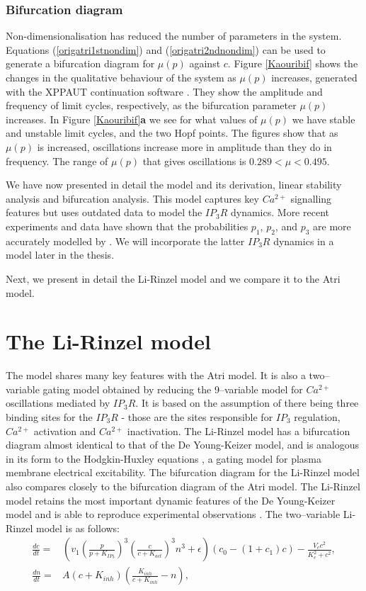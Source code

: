 \subsubsection{Bifurcation diagram}
Non-dimensionalisation has reduced the number of parameters in the system. Equations (\ref{origatri1stnondim}) and (\ref{origatri2ndnondim}) can be used to generate a bifurcation diagram for $\mu(p)$ against $c$. Figure \ref{Kaouribif} \cite{kaouri} shows the changes in the qualitative behaviour of the system as $\mu(p)$ increases, generated with the XPPAUT continuation software \cite{xppaut}. They show the amplitude and frequency of limit cycles, respectively, as the bifurcation parameter $\mu(p)$ increases. In Figure \ref{Kaouribif}\textbf{a} we see for what values of $\mu(p)$ we have stable and unstable limit cycles, and the two Hopf points. The figures show that as $\mu(p)$ is increased, oscillations increase more in amplitude than they do in frequency. The range of $\mu (p)$ that gives oscillations is $0.289<\mu <0.495$.

We have now presented in detail the  model and its derivation, linear stability analysis and bifurcation analysis. This model captures key $Ca^{2+}$ signalling features but uses outdated data to model the $IP_3R$ dynamics. More recent experiments and data have shown that the probabilities $p_1$, $p_2$, and $p_3$ are more accurately modelled by . We will incorporate the latter $IP_3R$ dynamics in a model later in the thesis.

Next, we present in detail the Li-Rinzel model and we compare it to the Atri model.

\section{The Li-Rinzel model}
The  model shares many key features with the Atri model. It is also a two--variable gating model obtained by reducing the 9--variable  model for $Ca^{2+}$ oscillations mediated by $IP_3R$. It is based on the assumption of there being three binding sites for the $IP_3R$ - those are the sites responsible for $IP_3$ regulation, $Ca^{2+}$ activation and $Ca^{2+}$ inactivation. The Li-Rinzel model has a bifurcation diagram almost identical to that of the De Young-Keizer model, and is analogous in its form to the Hodgkin-Huxley equations \cite{hodgkinhuxley}, a gating model for plasma membrane electrical excitability. The bifurcation diagram for the Li-Rinzel model also compares closely to the bifurcation diagram of the Atri model. The Li-Rinzel model retains the most important dynamic features of the De Young-Keizer model and is able to reproduce experimental observations . The two--variable Li-Rinzel model is as follows:
\begin{align}
    \frac{dc}{dt}=&\left(v_1\left(\frac{p}{p+K_{IP_3}}\right)^3\left(\frac{c}{c+K_{act}}\right)^3n^3+\epsilon\right)(c_0-(1+c_1)c)-\frac{V_ec^2}{K_e^2+c^2}\label{lirinzeltwovar1},\\
    \frac{dn}{dt}=&A(c+K_{inh})\left(\frac{K_{inh}}{c+K_{inh}}-n\right),\label{lirinzeltwovar2}
\end{align}


